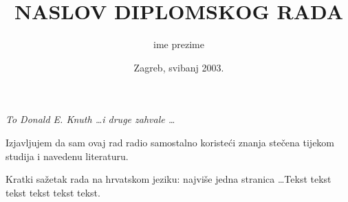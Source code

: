 \documentclass[a4paper,12pt]{report}
\title{NASLOV DIPLOMSKOG RADA}  %
\author{ime prezime}      %
\date{Zagreb, svibanj 2003.}      %
\begin{document}
%
%
\fsbkorice %
%
\fsbprvilist %
%
%
\begin{zahvala}
	\emph{To Donald E. Knuth \dots i druge zahvale \dots}
\end{zahvala}

\begin{izjava}
	Izjavljujem da sam ovaj rad radio samostalno koristeći znanja stečena
	tijekom studija i navedenu literaturu.
\end{izjava}

% 

\clearpage
\ifpdf
\fi
{}
\tableofcontents

%
\clearpage
\ifpdf
\fi
{}
\listoffigures

\clearpage
{}
\listoftables

%

\clearpage
\ifpdf
\fi
{}
\markboth{\MakeUppercase\nomname}{\MakeUppercase\nomname}
\printnomenclature

\clearpage
{}\addtocounter{brojstrana}{-1}

\begin{sazetak}
  \noindent Kratki sa\v{z}etak rada na hrvatskom jeziku: najvi\v{s}e jedna stranica
  \ldots Tekst tekst tekst tekst tekst tekst.
\end{sazetak}
\end{document}
